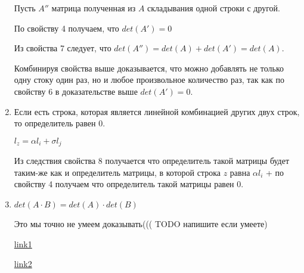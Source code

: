 \begin{enumerate}
	Пусть $A''$ матрица полученная из $A$ складывания одной строки с другой.
	
	По свойству 4 получаем, что $det(A') = 0$
	
	Из свойства 7 следует, что $det(A'') = det(A) + det(A') = det(A)$.
	
	Комбинируя свойства выше доказывается, что можно добавлять не только одну стоку один раз, но и любое произвольное количество раз, так как по свойству $6$ в доказательстве выше $det(A') = 0$.
	
	\item Если есть строка, которая является линейной комбинацией других двух строк, то определитель равен $0$.
	
	$l_z = \alpha l_i + \sigma l_j$
	
	Из следствия свойства 8 получается что определитель такой матрицы будет таким-же как и определитель матрицы, в которой строка $z$ равна $\alpha l_i$ + по свойству 4 получаем что определитель такой матрицы равен $0$.
	
	\item $det(A \cdot B) = det(A) \cdot det(B)$
	
	Это мы точно не умеем доказывать((( TODO напишите если умеете)
	
	\href{https://math.stackexchange.com/questions/60284/how-to-show-that-detab-deta-detb}{link1}
	
	\href{https://www.proofwiki.org/wiki/Determinant_of_Matrix_Product}{link2}
	
\end{enumerate}


\pagebreak

